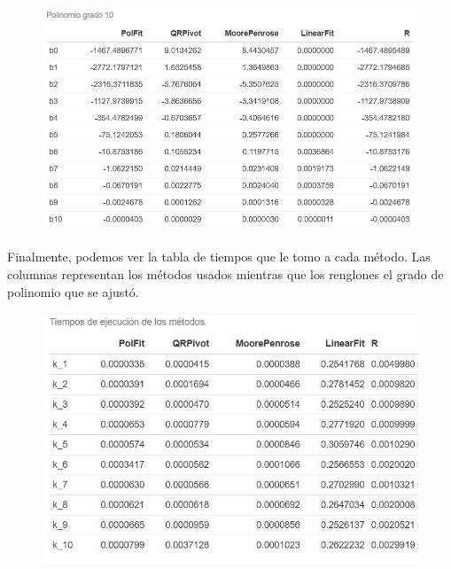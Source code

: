 \begin{figure}[h]
\begin{center}
\includegraphics[scale=0.5]{Imagenes/tabla_pol_10.JPG}
\end{center}
\end{figure}

Finalmente, podemos ver la tabla de tiempos que le tomo a cada método. Las columnas representan los métodos usados mientras que los renglones el grado de polinomio que se ajustó. 

\begin{figure}[h]
\begin{center}
\includegraphics[scale=0.5]{Imagenes/table_tiempos.JPG}
\end{center}
\end{figure}





